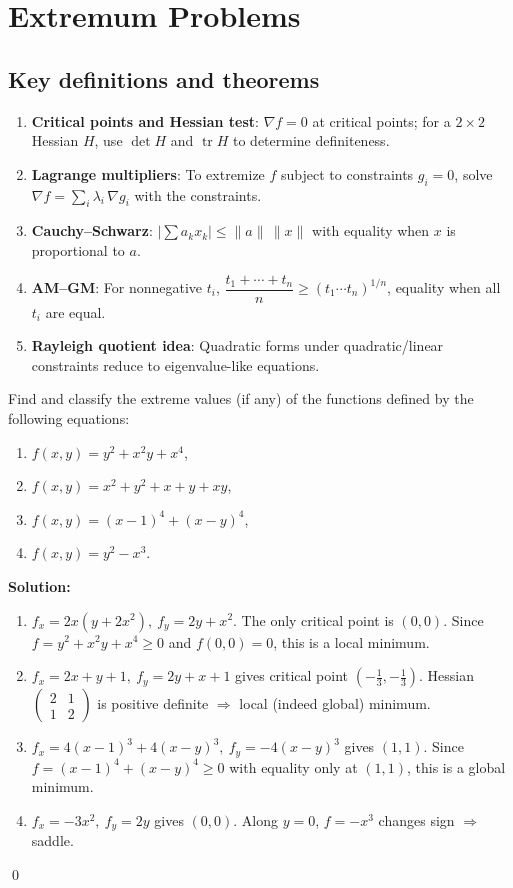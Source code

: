 \section{Extremum Problems}
\subsection*{Key definitions and theorems}
\begin{enumerate}[label=(\roman*)]
    \item \textbf{Critical points and Hessian test}: $\nabla f=0$ at critical points; for a $2\times2$ Hessian $H$, use $\det H$ and $\operatorname{tr} H$ to determine definiteness.
    \item \textbf{Lagrange multipliers}: To extremize $f$ subject to constraints $g_i=0$, solve $\nabla f=\sum_i \lambda_i\,\nabla g_i$ with the constraints.
    \item \textbf{Cauchy--Schwarz}: $\big|\sum a_k x_k\big|\le \|a\|\,\|x\|$ with equality when $x$ is proportional to $a$.
    \item \textbf{AM--GM}: For nonnegative $t_i$, $\dfrac{t_1+\cdots+t_n}{n}\ge (t_1\cdots t_n)^{1/n}$, equality when all $t_i$ are equal.
    \item \textbf{Rayleigh quotient idea}: Quadratic forms under quadratic/linear constraints reduce to eigenvalue-like equations.
\end{enumerate}


\begin{problembox}
Find and classify the extreme values (if any) of the functions defined by the following equations:
\begin{enumerate}[label=(\alph*)]
    \item \( f(x, y) = y^2 + x^2y + x^4 \),
    \item \( f(x, y) = x^2 + y^2 + x + y + xy \),
    \item \( f(x, y) = (x - 1)^4 + (x - y)^4 \),
    \item \( f(x, y) = y^2 - x^3 \).
\end{enumerate}
\end{problembox}

\noindent\textbf{Solution:}
\begin{enumerate}[label=(\alph*)]
    \item $f_x=2x(y+2x^2),\ f_y=2y+x^2$. The only critical point is $(0,0)$. Since $f=y^2+x^2y+x^4\ge 0$ and $f(0,0)=0$, this is a local minimum.
    \item $f_x=2x+y+1,\ f_y=2y+x+1$ gives critical point $(-\tfrac13,-\tfrac13)$. Hessian $\begin{pmatrix}2&1\\1&2\end{pmatrix}$ is positive definite $\Rightarrow$ local (indeed global) minimum.
    \item $f_x=4(x-1)^3+4(x-y)^3,\ f_y=-4(x-y)^3$ gives $(1,1)$. Since $f=(x-1)^4+(x-y)^4\ge0$ with equality only at $(1,1)$, this is a global minimum.
    \item $f_x=-3x^2,\ f_y=2y$ gives $(0,0)$. Along $y=0$, $f=-x^3$ changes sign $\Rightarrow$ saddle.
\end{enumerate}\qed


